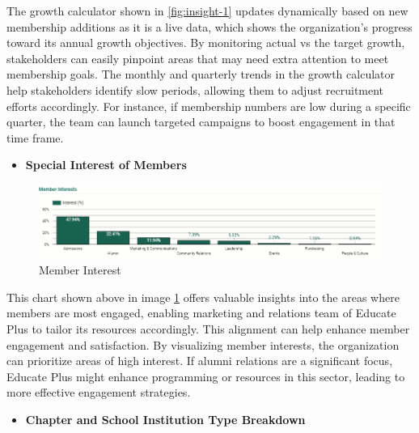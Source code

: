\documentclass[11pt,a4paper,]{article}
\providecommand{\tightlist}{%
  \setlength{\itemsep}{0pt}\setlength{\parskip}{0pt}}
\begin{document}
The growth calculator shown in \ref{fig:insight-1} updates dynamically based on new membership additions as it is a live data, which shows the organization's progress toward its annual growth objectives. By monitoring actual vs the target growth, stakeholders can easily pinpoint areas that may need extra attention to meet membership goals.
The monthly and quarterly trends in the growth calculator help stakeholders identify slow periods, allowing them to adjust recruitment efforts accordingly. For instance, if membership numbers are low during a specific quarter, the team can launch targeted campaigns to boost engagement in that time frame.

\begin{itemize}
\tightlist
\item
  \textbf{Special Interest of Members}
\end{itemize}

\begin{figure}[H]

{\centering \includegraphics[width=0.8\linewidth]{Images/member_interest} 

}

\caption{Member Interest}\label{fig:insight-2}
\end{figure}

This chart shown above in image \ref{fig:insight-2} offers valuable insights into the areas where members are most engaged, enabling marketing and relations team of Educate Plus to tailor its resources accordingly. This alignment can help enhance member engagement and satisfaction.
By visualizing member interests, the organization can prioritize areas of high interest. If alumni relations are a significant focus, Educate Plus might enhance programming or resources in this sector, leading to more effective engagement strategies.

\begin{itemize}
\tightlist
\item
  \textbf{Chapter and School Institution Type Breakdown}
\end{itemize}
\end{document}
